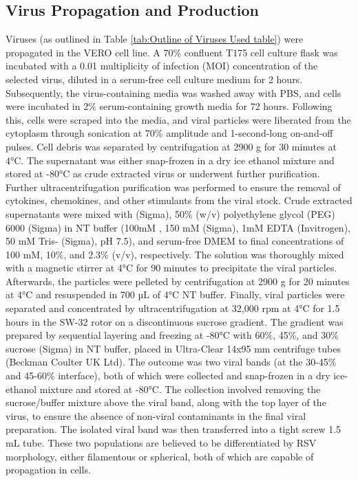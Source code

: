 \subsection{Virus Propagation and Production} \label{subsec:Virus Propagation and Production}
Viruses (as outlined in Table \ref{tab:Outline of Viruses Used table}) were propagated in the VERO cell line. A 70\% confluent T175 cell culture flask was incubated with a 0.01 multiplicity of infection (MOI) concentration of the selected virus, diluted in a serum-free cell culture medium for 2 hours. Subsequently, the virus-containing media was washed away with PBS, and cells were incubated in 2\% serum-containing growth media for 72 hours. Following this, cells were scraped into the media, and viral particles were liberated from the cytoplasm through sonication at 70\% amplitude and 1-second-long on-and-off pulses. Cell debris was separated by centrifugation at 2900 g for 30 minutes at 4°C. The supernatant was either snap-frozen in a dry ice ethanol mixture and stored at -80°C as crude extracted virus or underwent further purification. Further ultracentrifugation purification was performed to ensure the removal of cytokines, chemokines, and other stimulants from the viral stock. Crude extracted supernatants were mixed with  (Sigma), 50\% (w/v) polyethylene glycol (PEG) 6000 (Sigma) in NT buffer (100mM , 150 mM  (Sigma), 1mM EDTA (Invitrogen), 50 mM Tris- (Sigma), pH 7.5), and serum-free DMEM to final concentrations of 100 mM, 10\%, and 2.3\% (v/v), respectively. The solution was thoroughly mixed with a magnetic stirrer at 4°C for 90 minutes to precipitate the viral particles. Afterwards, the particles were pelleted by centrifugation at 2900 g for 20 minutes at 4°C and resuspended in 700 µL of 4°C NT buffer. Finally, viral particles were separated and concentrated by ultracentrifugation at 32,000 rpm at 4°C for 1.5 hours in the SW-32 rotor on a discontinuous sucrose gradient. The gradient was prepared by sequential layering and freezing at -80°C with 60\%, 45\%, and 30\% sucrose (Sigma) in NT buffer, placed in Ultra-Clear 14x95 mm centrifuge tubes (Beckman Coulter UK Ltd). The outcome was two viral bands (at the 30-45\% and 45-60\% interface), both of which were collected and snap-frozen in a dry ice-ethanol mixture and stored at -80°C. The collection involved removing the sucrose/buffer mixture above the viral band, along with the top layer of the virus, to ensure the absence of non-viral contaminants in the final viral preparation. The isolated viral band was then transferred into a tight screw 1.5 mL tube. These two populations are believed to be differentiated by RSV morphology, either filamentous or spherical, both of which are capable of propagation in cells.

